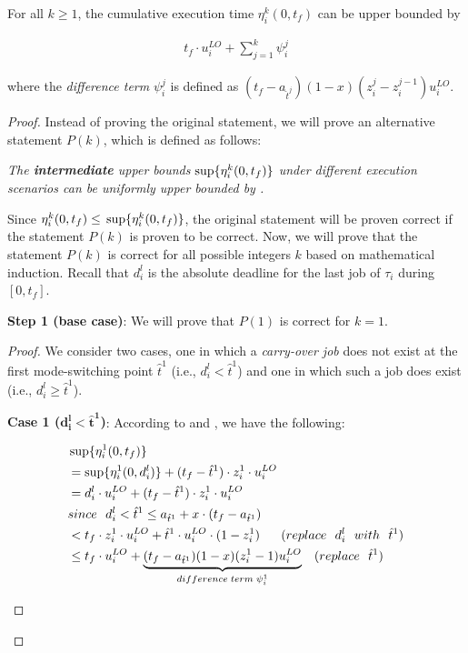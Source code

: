 \documentclass[10pt,journal,compsoc]{IEEEtran}
\begin{document}
\begin{lemma}
\label{lem:LOTask3}
For all $k\ge{1}$, the cumulative execution time $\eta_i^{k}(0,t_f)$ can be upper bounded by
\begin{small}
\begin{align}
t_f\cdot{u_i^{LO}}+\sum_{j=1}^{k}\psi_i^{j}
\label{eq:LOTask3:1}
\end{align}
\end{small}
where the \textit{difference term} $\psi_i^{j}$ is defined as $(t_f-a_{\hat{t}^{j}})(1-x)(z_i^{j}-z_i^{j-1})u_i^{LO}$.   
\end{lemma}
\begin{proof}
Instead of proving the original statement, we will prove an alternative statement $P(k)$, which is defined as follows:

\textit{The \textbf{intermediate} upper bounds $\sup\{\eta_i^{k}(0,t_f)\}$ under different execution scenarios can be uniformly upper bounded by .} 

Since $\eta_i^{k}(0,t_f)\le{}\sup\{\eta_i^{k}(0,t_f)\}$, the original statement will be proven correct if the statement $P(k)$ is proven to be correct. Now, we will prove that the statement $P(k)$ is correct for all possible integers $k$ based on mathematical induction. Recall that  $d_i^{l}$ is the absolute deadline for the last job of $\tau_i$ during $[0,t_f]$.  

\noindent\textbf{Step 1 (base case)}: We will prove that $P(1)$ is correct for $k=1$. 

\begin{proof}
We consider two cases, one in which a \textit{carry-over job} does not exist at the first mode-switching point $\hat{t}^1$ (i.e., $d_i^{l}<\hat{t}^1$) and one in which such a job does exist (i.e., $d_i^{l}\ge{}\hat{t}^1$).

\textbf{Case 1 ($\mathbf{d_i^{l}<\hat{t}^{1}}$)}: According to  and , we have the following:
\begin{small}
\begin{align*}
&\sups{\eta_i^1(0,t_f)} \\
&=\sups{\eta_i^1(0,d_i^{l})}+(t_f-\hat{t}^1)\cdot{}z_i^1\cdot{}u_i^{LO} \\
&=d_i^{l}\cdot{}u_i^{LO}+(t_f-\hat{t}^1)\cdot{}z_i^1\cdot{}u_i^{LO} \\
&since\ \ d_i^{l}<\hat{t}^1\le{}a_{\hat{t}^1}+x\cdot{(t_f-a_{\hat{t}^1})} \\
&<{}t_f\cdot{}z_i^1\cdot{}u_i^{LO}+\hat{t}^1\cdot{}u_i^{LO}\cdot{}(1-z_i^1)\ \ \ \ \  (replace\ \ d_i^{l}\ \ with\ \ \hat{t}^1) \\
&\le{}t_f\cdot{}u_i^{LO}+\underbrace{(t_f-a_{\hat{t}^1})(1-x)(z_i^1-1)u_i^{LO}}_{difference\;term\;\psi_i^{1}} \ \ \  (replace\ \ \hat{t}^1) 
\end{align*} 
\end{small}


\end{proof}
\end{proof}
\end{document}
